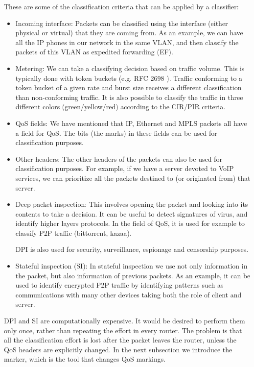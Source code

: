 These are some of the classification criteria that can be applied by a classifier:
\begin{itemize}
\item Incoming interface: Packets can be classified using the interface (either physical or virtual) that they are coming from.
As an example, we can have all the IP phones in our network in the same VLAN, and then classify the packets of this VLAN as expedited forwarding (EF).

\item Metering: We can take a classifying decision based on traffic volume.
This is typically done with token buckets (e.g. RFC 2698 \cite{rfc2698}).
Traffic conforming to a token bucket of a given rate and burst size receives a different classification than non-conforming traffic.
It is also possible to classify the traffic in three different colors (green/yellow/red) according to the CIR/PIR criteria.

\item QoS fields: We have mentioned that IP, Ethernet and MPLS packets all have a field for QoS.
The bits (the marks) in these fields can be used for classification purposes.

\item Other headers: The other headers of the packets can also be used for classification purposes.
For example, if we have a server devoted to VoIP services, we can prioritize all the packets destined to (or originated from) that server.

\item Deep packet inspection: This involves opening the packet and looking into its contents to take a decision.
It can be useful to detect signatures of virus, and identify higher layers protocols.
In the field of QoS, it is used for example to classify P2P traffic (bittorrent, kazaa).

DPI is also used for security, surveillance, espionage and censorship purposes.

\item Stateful inspection (SI): In stateful inspection we use not only information in the packet, but also information of previous packets.
As an example, it can be used to identify encrypted P2P traffic by identifying patterns such as communications with many other devices taking both the role of client and server.
\end{itemize}

DPI and SI are computationally expensive.
It would be desired to perform them only once, rather than repeating the effort in every router.
The problem is that all the classification effort is lost after the packet leaves the router, unless the QoS headers are explicitly changed.
In the next subsection we introduce the marker, which is the tool that changes QoS markings.

